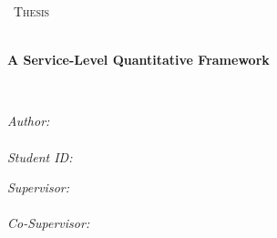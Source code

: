\documentclass[
  12pt,
  letterpaper,
  12pt,
  oneside,
  english,
  onehalfspacing,
  headsepline]{MastersDoctoralThesis}
\author{Tobias Zeier}
\begin{document}
\frontmatter %

\pagestyle{plain} %


\begin{titlepage}
\begin{center}

\vspace*{.06\textheight}
{\scshape\huge \univname\par}\vspace{1.5cm} %
\textsc{\Large \degreename\ Thesis}\\[0.5cm] %

\HRule \\[0.4cm] %
{\LARGE \bfseries \ttitle\par}\vspace{0.2cm} %
{\normalsize\bfseries A Service-Level Quantitative
Framework\par}\vspace{0.2cm} %
\HRule \\[1.5cm] %
 
\begin{minipage}[t]{0.4\textwidth}
\begin{flushleft} \normalsize
\emph{Author:}\\
\authorname\\[0.3cm]
\emph{Student ID:}\\
\thesistudentid
\end{flushleft}
\end{minipage}
\begin{minipage}[t]{0.4\textwidth}
\begin{flushright} \normalsize
\emph{Supervisor:} \\
%
\supname\\[0.3cm]

\emph{Co-Supervisor:}\\
\cosupname
\end{flushright}
\end{minipage}\\[3cm]
 
\vfill


\end{center}
\end{titlepage}
\end{document}
